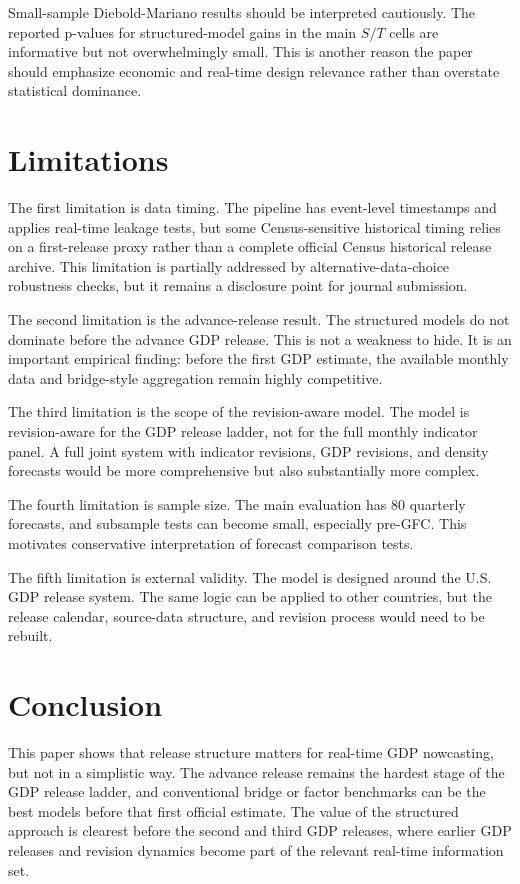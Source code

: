 \documentclass[12pt]{article}
\begin{document}
Small-sample Diebold-Mariano results should be interpreted cautiously. The reported p-values for structured-model gains in the main $S/T$ cells are informative but not overwhelmingly small. This is another reason the paper should emphasize economic and real-time design relevance rather than overstate statistical dominance.

\section{Limitations}
\label{sec:limitations}

The first limitation is data timing. The pipeline has event-level timestamps and applies real-time leakage tests, but some Census-sensitive historical timing relies on a first-release proxy rather than a complete official Census historical release archive. This limitation is partially addressed by alternative-data-choice robustness checks, but it remains a disclosure point for journal submission.

The second limitation is the advance-release result. The structured models do not dominate before the advance GDP release. This is not a weakness to hide. It is an important empirical finding: before the first GDP estimate, the available monthly data and bridge-style aggregation remain highly competitive.

The third limitation is the scope of the revision-aware model. The model is revision-aware for the GDP release ladder, not for the full monthly indicator panel. A full joint system with indicator revisions, GDP revisions, and density forecasts would be more comprehensive but also substantially more complex.

The fourth limitation is sample size. The main evaluation has 80 quarterly forecasts, and subsample tests can become small, especially pre-GFC. This motivates conservative interpretation of forecast comparison tests.

The fifth limitation is external validity. The model is designed around the U.S. GDP release system. The same logic can be applied to other countries, but the release calendar, source-data structure, and revision process would need to be rebuilt.

\section{Conclusion}
\label{sec:conclusion}

This paper shows that release structure matters for real-time GDP nowcasting, but not in a simplistic way. The advance release remains the hardest stage of the GDP release ladder, and conventional bridge or factor benchmarks can be the best models before that first official estimate. The value of the structured approach is clearest before the second and third GDP releases, where earlier GDP releases and revision dynamics become part of the relevant real-time information set.
\end{document}
